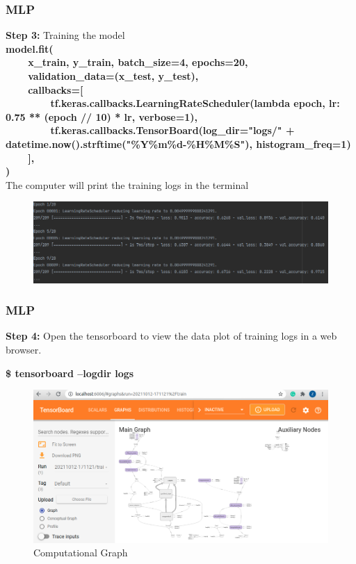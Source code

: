 \documentclass{beamer}
\begin{document}
\begin{frame}
	\frametitle{MLP}
	\begin{flushleft}
		\textbf{Step 3:} Training the model \\
		\textbf{\color{blue} \scriptsize
			model.fit( \\
			~~~~x\_train, y\_train, batch\_size=4, epochs=20, \\
			~~~~validation\_data=(x\_test,  y\_test), \\
			~~~~callbacks=[ \\
			~~~~~~~~tf.keras.callbacks.LearningRateScheduler(lambda epoch, lr: 0.75 ** (epoch // 10) * lr, verbose=1), \\
			~~~~~~~~tf.keras.callbacks.TensorBoard(log\_dir="logs/" + datetime.now().strftime("\%Y\%m\%d-\%H\%M\%S"), histogram\_freq=1) \\
			~~~~], \\
			) \\
		}
		The computer will print the training logs in the terminal
	\end{flushleft}
	\begin{center}
		\begin{figure}
	    \includegraphics[width=0.8\linewidth]{./src/figures/9.png}
	  \end{figure}
	\end{center}
\end{frame}

\begin{frame}
	\frametitle{MLP}
	\begin{flushleft}
		\textbf{Step 4:} Open the tensorboard to view the data plot of training logs in a web browser. \\
	\end{flushleft}
	\begin{center}
		\textbf{\$ \color{blue} tensorboard --logdir logs}
	\end{center}
	\begin{center}
		\begin{figure}
        \includegraphics[width=0.85\linewidth]{./src/figures/10_2.png}
        \caption{Computational Graph}
		\end{figure}
	\end{center}
\end{frame}
\end{document}
